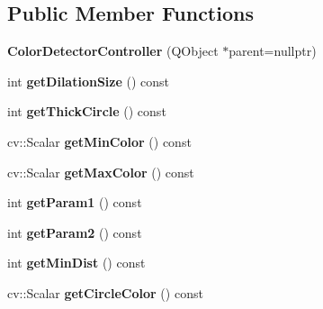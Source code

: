 \subsection*{Public Member Functions}
\begin{DoxyCompactItemize}
\item 
\mbox{\label{class_color_detector_controller_a2f35953352a4cba8a1907ca46cf08b62}} 
{\bfseries Color\+Detector\+Controller} (Q\+Object $\ast$parent=nullptr)
\item 
\mbox{\label{class_color_detector_controller_afa394dd4972d89f69f06e10bd7992782}} 
int {\bfseries get\+Dilation\+Size} () const
\item 
\mbox{\label{class_color_detector_controller_a7393d5517b607068db7f2ea78484c282}} 
int {\bfseries get\+Thick\+Circle} () const
\item 
\mbox{\label{class_color_detector_controller_a8d8b3838562b95f99e17633e3d4c0e12}} 
cv\+::\+Scalar {\bfseries get\+Min\+Color} () const
\item 
\mbox{\label{class_color_detector_controller_a11c07f34537bc17ff113149f94bb9182}} 
cv\+::\+Scalar {\bfseries get\+Max\+Color} () const
\item 
\mbox{\label{class_color_detector_controller_a8cc70b5d53544e5d03ac10b11743c9f5}} 
int {\bfseries get\+Param1} () const
\item 
\mbox{\label{class_color_detector_controller_a3bea337471bf91256e55c1f729646a32}} 
int {\bfseries get\+Param2} () const
\item 
\mbox{\label{class_color_detector_controller_adaf0bc83b6235e0e9997b34ab757f6fd}} 
int {\bfseries get\+Min\+Dist} () const
\item 
\mbox{\label{class_color_detector_controller_a102cd879ea47cd3143316cd15b752bb0}} 
cv\+::\+Scalar {\bfseries get\+Circle\+Color} () const
\item 

\end{DoxyCompactItemize}
